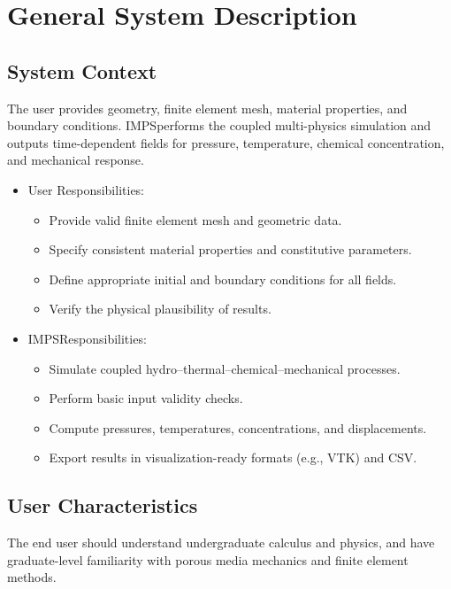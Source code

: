 \documentclass[12pt]{article}
\newcommand{\progname}{IMPS}
\begin{document}
\section{General System Description}

\subsection{System Context}

The user provides geometry, finite element mesh, material properties, and
boundary conditions. \progname performs the coupled multi-physics simulation and
outputs time-dependent fields for pressure, temperature, chemical concentration,
and mechanical response.

\begin{itemize}
  \item User Responsibilities:
  \begin{itemize}
    \item Provide valid finite element mesh and geometric data.
    \item Specify consistent material properties and constitutive parameters.
    \item Define appropriate initial and boundary conditions for all fields.
    \item Verify the physical plausibility of results.
  \end{itemize}
  \item \progname Responsibilities:
  \begin{itemize}
    \item Simulate coupled hydro--thermal--chemical--mechanical processes.
    \item Perform basic input validity checks.
    \item Compute pressures, temperatures, concentrations, and displacements.
    \item Export results in visualization-ready formats (e.g., VTK) and CSV.
  \end{itemize}
\end{itemize}

\subsection{User Characteristics} \label{SecUserCharacteristics}

The end user should understand undergraduate calculus and physics, and have
graduate-level familiarity with porous media mechanics and finite element
methods.
\end{document}
